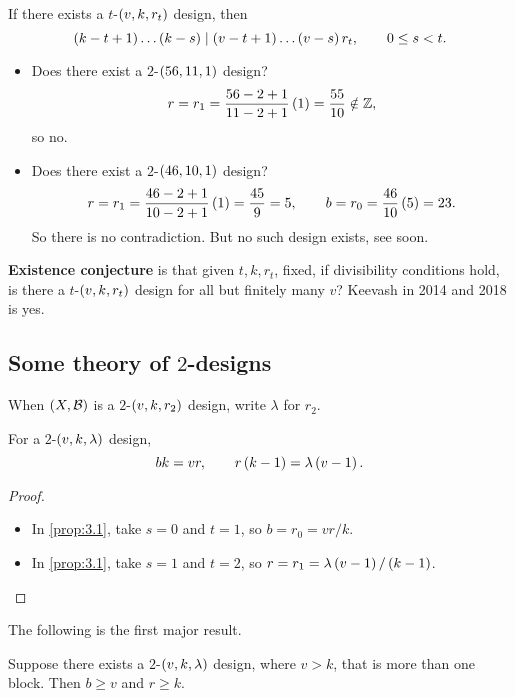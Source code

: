 \begin{corollary}
If there exists a $ t $-$ \br{v, k, r_t} $ design, then
$$ \br{k - t + 1} \dots \br{k - s} \mid \br{v - t + 1} \dots \br{v - s}r_t, \qquad 0 \le s < t. $$
\end{corollary}

\begin{example*}
\hfill
\begin{itemize}
\item Does there exist a $ 2 $-$ \br{56, 11, 1} $ design?
$$ r = r_1 = \dfrac{56 - 2 + 1}{11 - 2 + 1}\br{1} = \dfrac{55}{10} \notin \Z, $$
so no.
\item Does there exist a $ 2 $-$ \br{46, 10, 1} $ design?
$$ r = r_1 = \dfrac{46 - 2 + 1}{10 - 2 + 1}\br{1} = \dfrac{45}{9} = 5, \qquad b = r_0 = \dfrac{46}{10}\br{5} = 23. $$
So there is no contradiction. But no such design exists, see soon.
\end{itemize}
\end{example*}

\textbf{Existence conjecture} is that given $ t, k, r_t $, fixed, if divisibility conditions hold, is there a $ t $-$ \br{v, k, r_t} $ design for all but finitely many $ v $? Keevash in 2014 and 2018 is yes.

\pagebreak

\subsection{Some theory of $ 2 $-designs}

When $ \br{X, \BB} $ is a $ 2 $-$ \br{v, k, r_2} $ design, write $ \lambda $ for $ r_2 $.

\begin{proposition}
For a $ 2 $-$ \br{v, k, \lambda} $ design,
$$ bk = vr, \qquad r\br{k - 1} = \lambda\br{v - 1}. $$
\end{proposition}

\begin{proof}
\hfill
\begin{itemize}
\item In \ref{prop:3.1}, take $ s = 0 $ and $ t = 1 $, so $ b = r_0 = vr / k $.
\item In \ref{prop:3.1}, take $ s = 1 $ and $ t = 2 $, so $ r = r_1 = \lambda\br{v - 1} / \br{k - 1} $.
\end{itemize}
\end{proof}

The following is the first major result.

\begin{theorem}
\label{thm:3.4}
Suppose there exists a $ 2 $-$ \br{v, k, \lambda} $ design, where $ v > k $, that is more than one block. Then $ b \ge v $ and $ r \ge k $.
\end{theorem}

